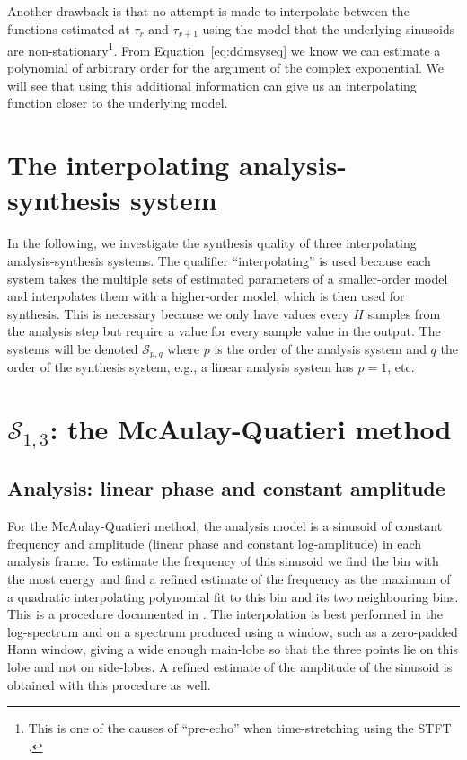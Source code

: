 Another drawback is that no attempt is made to interpolate between the functions
estimated at $\tau_{r}$ and $\tau_{r+1}$ using the model that the underlying
sinusoids are non-stationary\footnote{%
    This is one of the causes of ``pre-echo'' when
    time-stretching using the STFT \cite{roebel2003transient}.%
}.
From Equation~\ref{eq:ddmsyseq} we know we can estimate a polynomial of
arbitrary order for the argument of the complex exponential. We will see that
using this additional information can give us an interpolating function closer
to the underlying model.

\section{The interpolating analysis-synthesis system}

In the following, we investigate the synthesis quality of three interpolating
analysis-synthesis systems. The qualifier ``interpolating'' is used because each
system takes the multiple sets of estimated parameters of a smaller-order model
and interpolates them with a higher-order model, which is then used for
synthesis. This is necessary because we only have values every $H$ samples from
the analysis step but require a value for every sample value in the output. The
systems will be denoted $\mathscr{S}_{p,q}$ where $p$ is the order of the
analysis system and $q$ the order of the synthesis system, e.g., a linear
analysis system has $p=1$, etc.

\section{$\mathscr{S}_{1,3}$: the McAulay-Quatieri method}

\subsection{Analysis: linear phase and constant amplitude%
\label{sec:S13analysis}}

For the McAulay-Quatieri method, the analysis model is a sinusoid of constant frequency
and amplitude
(linear phase and constant log-amplitude) in each analysis frame. To estimate the frequency of this
sinusoid we find the bin with the most energy and find a refined estimate of the
frequency as the maximum of a quadratic interpolating polynomial fit to this bin
and its two neighbouring bins. This is a procedure documented in
\cite[p.~45]{serra1989system}. The interpolation is best performed in the
log-spectrum and on a spectrum produced using a window, such as a zero-padded
Hann window, giving a wide enough main-lobe so that the three points lie on this
lobe and not on side-lobes. A refined estimate of the amplitude of the sinusoid
is obtained with this procedure as well.

